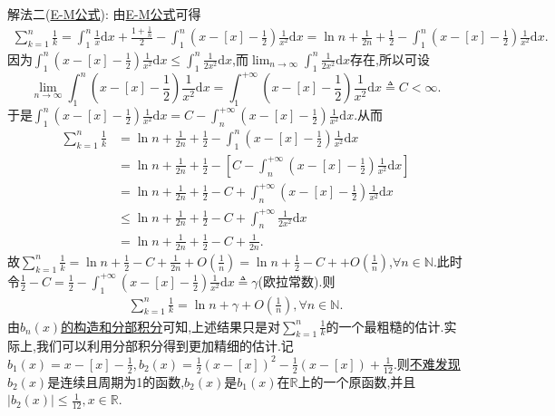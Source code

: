 \documentclass[../../main.tex]{subfiles}
\begin{document}
\begin{solution}
{\color{blue}解法二(\hyperref[proposition:0阶欧拉麦克劳林公式(0阶E-M公式)]{E-M公式}):}
由\hyperref[proposition:0阶欧拉麦克劳林公式(0阶E-M公式)]{E-M公式}可得
\begin{align}\label{equation:4.4617}
\sum_{k = 1}^n\frac{1}{k}=\int_1^n\frac{1}{x}\mathrm{d}x+\frac{1+\frac{1}{n}}{2}-\int_1^n\left(x - [x]-\frac{1}{2}\right)\frac{1}{x^2}\mathrm{d}x
=\ln n+\frac{1}{2n}+\frac{1}{2}-\int_1^n\left(x - [x]-\frac{1}{2}\right)\frac{1}{x^2}\mathrm{d}x.
\end{align}
因为\(\int_1^n\left(x - [x]-\frac{1}{2}\right)\frac{1}{x^2}\mathrm{d}x\leqslant\int_1^n\frac{1}{2x^2}\mathrm{d}x\),而\(\lim_{n\rightarrow\infty}\int_1^n\frac{1}{2x^2}\mathrm{d}x\)存在,所以可设
\[
\lim_{n\rightarrow\infty}\int_1^n\left(x - [x]-\frac{1}{2}\right)\frac{1}{x^2}\mathrm{d}x=\int_1^{+\infty}\left(x - [x]-\frac{1}{2}\right)\frac{1}{x^2}\mathrm{d}x\triangleq C<\infty.
\]
于是\(\int_1^n\left(x - [x]-\frac{1}{2}\right)\frac{1}{x^2}\mathrm{d}x = C-\int_n^{+\infty}\left(x - [x]-\frac{1}{2}\right)\frac{1}{x^2}\mathrm{d}x\).从而
\begin{align*}
\sum_{k = 1}^n\frac{1}{k}&=\ln n+\frac{1}{2n}+\frac{1}{2}-\int_1^n\left(x - [x]-\frac{1}{2}\right)\frac{1}{x^2}\mathrm{d}x\\
&=\ln n+\frac{1}{2n}+\frac{1}{2}-\left[C-\int_n^{+\infty}\left(x - [x]-\frac{1}{2}\right)\frac{1}{x^2}\mathrm{d}x\right]\\
&=\ln n+\frac{1}{2n}+\frac{1}{2}-C+\int_n^{+\infty}\left(x - [x]-\frac{1}{2}\right)\frac{1}{x^2}\mathrm{d}x\\
&\leqslant\ln n+\frac{1}{2n}+\frac{1}{2}-C+\int_n^{+\infty}\frac{1}{2x^2}\mathrm{d}x\\
&=\ln n+\frac{1}{2n}+\frac{1}{2}-C+\frac{1}{2n}.
\end{align*}
故\(\sum_{k=1}^n{\frac{1}{k}}=\ln n+\frac{1}{2}-C+\frac{1}{2n}+O\left( \frac{1}{n} \right) =\ln n+\frac{1}{2}-C++O\left( \frac{1}{n} \right)\),\(\forall n\in\mathbb{N}\).此时令\(\frac{1}{2}-C=\frac{1}{2}-\int_1^{+\infty}\left(x - [x]-\frac{1}{2}\right)\frac{1}{x^2}\mathrm{d}x\triangleq\gamma\)(欧拉常数).则
\begin{align}\label{equation:4.461888}
\sum_{k=1}^n{\frac{1}{k}}=\ln n+\gamma+O\left( \frac{1}{n} \right),\forall n\in\mathbb{N}.
\end{align}
由\hyperlink{remark:利用0阶E-M公式精细估阶的构造}{$b_n(x)$的构造和分部积分}可知,上述结果只是对$\sum_{k=1}^n{\frac{1}{k}}$的一个最粗糙的估计.实际上,我们可以利用分部积分得到更加精细的估计.记$b_1(x)=x-[x]-\frac{1}{2},b_2\left( x \right) =\frac{1}{2}\left( x-\left[ x \right] \right) ^2-\frac{1}{2}\left( x-\left[ x \right] \right) +\frac{1}{12}$.则\hyperlink{b2性质}{不难发现}$b_2(x)$是连续且周期为1的函数,$b_2(x)$是$b_1(x)$在$\mathbb{R}$上的一个原函数,并且$|b_2(x)|\leq \frac{1}{12},x\in \mathbb{R}$.

\end{solution}
\end{document}
